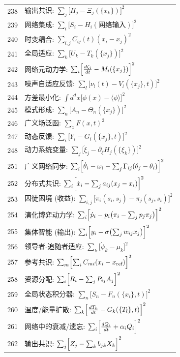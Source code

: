 \documentclass[11pt,a4paper]{article}
\begin{document}
\begin{longtable}{r l}
		238 & 输出共识: $\sum_j\bigl[\Pi_j - \Xi_j(\{x_k\})\bigr]^2$ \\
		239 & 网络集成: $\sum_i\bigl[S_i - H_i(\text{网络输入})\bigr]^2$ \\
		240 & 时变耦合: $\sum_{i,j}C_{ij}(t)(x_i - x_j)^2$ \\
		241 & 全局适应: $\sum_k\bigl[U_k - T_k(\{x_j\})\bigr]^2$ \\
		242 & 网络元动力学: $\sum_i\Bigl[\frac{d\zeta_i}{dt} - M_i(\{x_j\})\Bigr]^2$ \\
		243 & 噪声自适应反馈: $\sum_l\bigl[\nu_l(t) - V_l(\{x_j\},t)\bigr]^2$ \\
		244 & 方差最小化: $\int d^dx\bigl[\phi(x) - \langle\phi\rangle\bigr]^2$ \\
		245 & 模式形成: $\sum_n\bigl[A_n - \Theta_n(\{x_j\})\bigr]^2$ \\
		246 & 广义场泛函: $\sum_x F(x,t)^2$ \\
		247 & 动态反馈: $\sum_i\bigl[Y_i - G_i(\{x_j\},t)\bigr]^2$ \\
		248 & 动力系统变量: $\sum_j\bigl[\dot\xi_j - \partial_\xi H_j(\{\xi_k\})\bigr]^2$ \\
		251 & 广义网络同步: $\sum_i\Bigl[\dot\theta_i - \omega_i - \sum_j\Gamma_{ij}(\theta_j-\theta_i)\Bigr]^2$ \\
		252 & 分布式共识: $\sum_i\Bigl[\dot x_i - \sum_j a_{ij}(x_j-x_i)\Bigr]^2$ \\
		253 & 囚徒困境 (收益): $\sum_{i,j}\bigl[\pi_i(s_i,s_j) - \pi_j(s_j,s_i)\bigr]^2$ \\
		254 & 演化博弈动力学: $\sum_i\Bigl[\dot p_i - p_i\bigl(\pi_i - \sum_j p_j\pi_j\bigr)\Bigr]^2$ \\
		255 & 集体智能 (输出): $\sum_i\Bigl[y_i - \sigma\bigl(\sum_j w_{ij}x_j\bigr)\Bigr]^2$ \\
		256 & 领导者‑追随者适应: $\sum_k\bigl[\dot\psi_k - \mu_k\bigr]^2$ \\
		257 & 参考共识: $\sum_m\Bigl[\sum_i C_{mi}(x_i-x_{\text{ref}})\Bigr]^2$ \\
		258 & 资源分配: $\sum_i\Bigl[R_i - \sum_j P_{ij}A_j\Bigr]^2$ \\
		259 & 全局状态积分器: $\sum_n\bigl[S_n - F_n(\{x_i\},t)\bigr]^2$ \\
		260 & 温度/能量扩散: $\sum_k\Bigl[\frac{dT_k}{dt} - G_k(\{T_l\},t)\Bigr]^2$ \\
		261 & 网络中的衰减/遗忘: $\sum_i\Bigl[\frac{dQ_i}{dt} + \alpha_i Q_i\Bigr]^2$ \\
		262 & 输出共识: $\sum_j\Bigl[Z_j - \sum_k b_{jk}X_k\Bigr]^2$ \\

\end{longtable}
\end{document}
